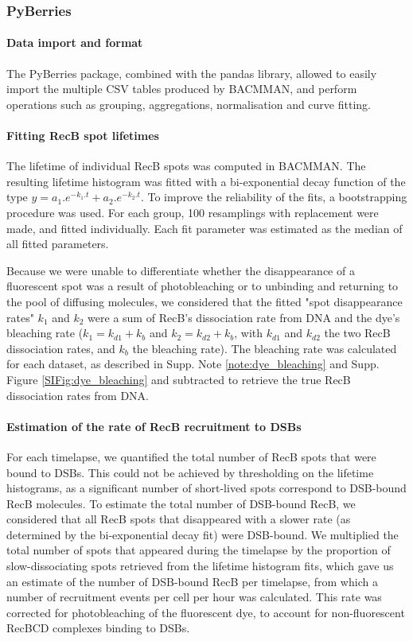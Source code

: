 \subsubsection*{PyBerries}
\paragraph*{Data import and format}
The PyBerries package, combined with the pandas library, allowed to easily import the multiple CSV tables produced by BACMMAN, and perform operations such as grouping, aggregations, normalisation and curve fitting.

\paragraph*{Fitting RecB spot lifetimes}
The lifetime of individual RecB spots was computed in BACMMAN. The resulting lifetime histogram was fitted with a bi-exponential decay function of the type $y=a_1.e^{-k_1.t} + a_2.e^{-k_2.t}$. To improve the reliability of the fits, a bootstrapping procedure was used. For each group, 100 resamplings with replacement were made, and fitted individually. Each fit parameter was estimated as the median of all fitted parameters.

Because we were unable to differentiate whether the disappearance of a fluorescent spot was a result of photobleaching or to unbinding and returning to the pool of diffusing molecules, we considered that the fitted "spot disappearance rates" $k_1$ and $k_2$ were a sum of RecB's dissociation rate from DNA and the dye's bleaching rate ($k_1=k_{d1}+k_b$ and $k_2=k_{d2}+k_b$, with $k_{d1}$ and $k_{d2}$ the two RecB dissociation rates, and $k_b$ the bleaching rate). The bleaching rate was calculated for each dataset, as described in Supp. Note \ref{note:dye_bleaching} and Supp. Figure \ref{SIFig:dye_bleaching} and subtracted to retrieve the true RecB dissociation rates from DNA.

\paragraph*{Estimation of the rate of RecB recruitment to DSBs}
For each timelapse, we quantified the total number of RecB spots that were bound to DSBs. This could not be achieved by thresholding on the lifetime histograms, as a significant number of short-lived spots correspond to DSB-bound RecB molecules. To estimate the total number of DSB-bound RecB, we considered that all RecB spots that disappeared with a slower rate (as determined by the bi-exponential decay fit) were DSB-bound. We multiplied the total number of spots that appeared during the timelapse by the proportion of slow-dissociating spots retrieved from the lifetime histogram fits, which gave us an estimate of the number of DSB-bound RecB per timelapse, from which a number of recruitment events per cell per hour was calculated. This rate was corrected for photobleaching of the fluorescent dye, to account for non-fluorescent RecBCD complexes binding to DSBs.

